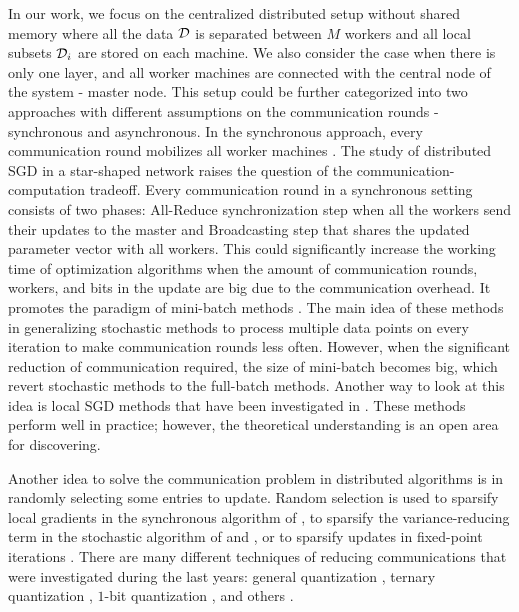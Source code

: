 In our work, we focus on the centralized distributed setup without shared memory \cite{mishchenko2018} where all the data $\mathcal{D}$ is separated between $M$ workers and all local subsets $\mathcal{D}_i$ are stored on each machine. {\color{blue}We also consider the case when there is only one layer, and all worker machines are connected with the central node of the system - master node. }This setup could be further categorized into two approaches with different assumptions on the communication rounds - synchronous and asynchronous. In the synchronous approach, every communication round mobilizes all worker machines \cite{BoydPCPE11,Chen2016,Tsianos12}. The study of distributed SGD in a star-shaped network \cite{yang2013trading} raises the question of the communication-computation tradeoff. {\color{blue} Every communication round in a synchronous setting consists of two phases: All-Reduce synchronization step when all the workers send their updates to the master and Broadcasting step that shares the updated parameter vector with all workers. This could significantly increase the working time of optimization algorithms when the amount of communication rounds, workers, and bits in the update are big due to the communication overhead.} It promotes the paradigm of mini-batch methods \cite{dekel2012optimal, shalev2013accelerated, shamir2014distributed, qu2016coordinate, takavc2015distributed}. The main idea of these methods in generalizing stochastic methods to process multiple data points on every iteration to make communication rounds less often. However, when the significant reduction of communication required, the size of mini-batch becomes big, which revert stochastic methods to the full-batch methods. Another way to look at this idea is local SGD methods that have been investigated in \cite{stich2018local,khaled2019first,khaled2020tighter,li2019federated,ma2017distributed}. These methods perform well in practice; however, the theoretical understanding is an open area for discovering.

Another idea to solve the communication problem in distributed algorithms is in randomly selecting some entries to update. Random selection is used to sparsify local gradients in the synchronous algorithm of \cite{wangni2018gradient}, to sparsify the variance-reducing term in the stochastic algorithm of \cite{leblond2016asaga} and \cite{pedregosa2017breaking}, or to sparsify updates in fixed-point iterations \cite{peng2016arock}. There are many different techniques of reducing communications that were investigated during the last years:  general quantization \cite{alistarh2017qsgd, horvath2019stochastic, koloskova2019decentralized}, ternary quantization \cite{wen2017terngrad}, $1$-bit quantization \cite{bernstein2018signsgd}, and others \cite{ben2019demystifying, lin2017deep}.


